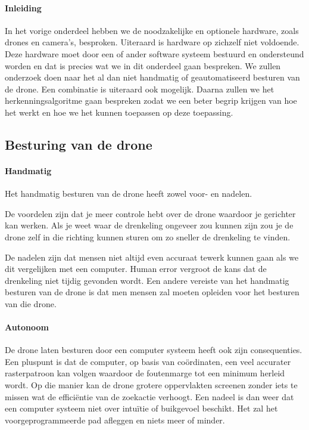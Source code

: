 \paragraph{Inleiding}
In het vorige onderdeel hebben we de noodzakelijke en optionele hardware, zoals drones en camera's, besproken. Uiteraard is hardware op zichzelf niet voldoende. Deze hardware moet door een of ander software systeem bestuurd en ondersteund worden en dat is precies wat we in dit onderdeel gaan bespreken. We zullen onderzoek doen naar het al dan niet handmatig of geautomatiseerd besturen van de drone. Een combinatie is uiteraard ook mogelijk. Daarna zullen we het herkenningsalgoritme gaan bespreken zodat we een beter begrip krijgen van hoe het werkt en hoe we het kunnen toepassen op deze toepassing.

\subsection{Besturing van de drone}

\paragraph{Handmatig}

Het handmatig besturen van de drone heeft zowel voor- en nadelen. 

De voordelen zijn dat je meer controle hebt over de drone waardoor je gerichter kan werken. Als je weet waar de drenkeling ongeveer zou kunnen zijn zou je de drone zelf in die richting kunnen sturen om zo sneller de drenkeling te vinden. 

De nadelen zijn dat mensen niet altijd even accuraat tewerk kunnen gaan als we dit vergelijken met een computer. Human error vergroot de kans dat de drenkeling niet tijdig gevonden wordt. Een andere vereiste van het handmatig besturen van de drone is dat men mensen zal moeten opleiden voor het besturen van die drone.

\paragraph{Autonoom}

De drone laten besturen door een computer systeem heeft ook zijn consequenties. Een pluspunt is dat de computer, op basis van coördinaten, een veel accurater rasterpatroon kan volgen waardoor de foutenmarge tot een minimum herleid wordt. Op die manier kan de drone grotere oppervlakten screenen zonder iets te missen wat de efficiëntie van de zoekactie verhoogt. Een nadeel is dan weer dat een computer systeem niet over intuïtie of buikgevoel beschikt. Het zal het voorgeprogrammeerde pad afleggen en niets meer of minder.  

